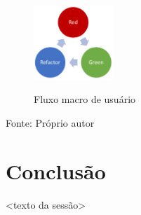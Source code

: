 \documentclass[12pt,a4paper,oneside,english,brazil]{article}
\begin{document}
    \begin{center}
      \begin{figure}[h]
        \centering
        \caption{Fluxo macro de usuário}
        \includegraphics[width=3cm]{ciclo-tdd}
        \label{fig:fluxogeral}
      \end{figure}
      Fonte: Próprio autor
    \end{center}

    

  \section{Conclusão}

    <texto da sessão>

  \clearpage

  \renewcommand\refname{Referências Bibliográficas}

    
    
\end{document}
